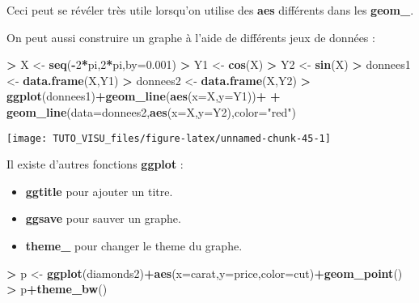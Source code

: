 \documentclass[]{article}
\newenvironment{Shaded}{\begin{snugshade}}{\end{snugshade}}
\newcommand{\DataTypeTok}[1]{\textcolor[rgb]{0.13,0.29,0.53}{#1}}
\newcommand{\DecValTok}[1]{\textcolor[rgb]{0.00,0.00,0.81}{#1}}
\newcommand{\FloatTok}[1]{\textcolor[rgb]{0.00,0.00,0.81}{#1}}
\newcommand{\KeywordTok}[1]{\textcolor[rgb]{0.13,0.29,0.53}{\textbf{#1}}}
\newcommand{\NormalTok}[1]{#1}
\newcommand{\OperatorTok}[1]{\textcolor[rgb]{0.81,0.36,0.00}{\textbf{#1}}}
\newcommand{\StringTok}[1]{\textcolor[rgb]{0.31,0.60,0.02}{#1}}
\providecommand{\tightlist}{%
  \setlength{\itemsep}{0pt}\setlength{\parskip}{0pt}}
\theoremstyle{definition}
\theoremstyle{definition}
\theoremstyle{definition}
\theoremstyle{remark}
\begin{document}
Ceci peut se révéler très utile lorsqu'on utilise des \textbf{aes} différents dans les \textbf{geom\_}.

On peut aussi construire un graphe à l'aide de différents jeux de données :

\begin{Shaded}
\begin{Highlighting}[]
\OperatorTok{>}\StringTok{ }\NormalTok{X <-}\StringTok{ }\KeywordTok{seq}\NormalTok{(}\OperatorTok{-}\DecValTok{2}\OperatorTok{*}\NormalTok{pi,}\DecValTok{2}\OperatorTok{*}\NormalTok{pi,}\DataTypeTok{by=}\FloatTok{0.001}\NormalTok{)}
\OperatorTok{>}\StringTok{ }\NormalTok{Y1 <-}\StringTok{ }\KeywordTok{cos}\NormalTok{(X)}
\OperatorTok{>}\StringTok{ }\NormalTok{Y2 <-}\StringTok{ }\KeywordTok{sin}\NormalTok{(X)}
\OperatorTok{>}\StringTok{ }\NormalTok{donnees1 <-}\StringTok{ }\KeywordTok{data.frame}\NormalTok{(X,Y1)}
\OperatorTok{>}\StringTok{ }\NormalTok{donnees2 <-}\StringTok{ }\KeywordTok{data.frame}\NormalTok{(X,Y2)}
\OperatorTok{>}\StringTok{ }\KeywordTok{ggplot}\NormalTok{(donnees1)}\OperatorTok{+}\KeywordTok{geom_line}\NormalTok{(}\KeywordTok{aes}\NormalTok{(}\DataTypeTok{x=}\NormalTok{X,}\DataTypeTok{y=}\NormalTok{Y1))}\OperatorTok{+}
\OperatorTok{+}\StringTok{   }\KeywordTok{geom_line}\NormalTok{(}\DataTypeTok{data=}\NormalTok{donnees2,}\KeywordTok{aes}\NormalTok{(}\DataTypeTok{x=}\NormalTok{X,}\DataTypeTok{y=}\NormalTok{Y2),}\DataTypeTok{color=}\StringTok{"red"}\NormalTok{)}
\end{Highlighting}
\end{Shaded}

\begin{center}\texttt{[image: TUTO\_VISU\_files/figure-latex/unnamed-chunk-45-1]} \end{center}

Il existe d'autres fonctions \textbf{ggplot} :

\begin{itemize}
\tightlist
\item
  \textbf{ggtitle} pour ajouter un titre.
\item
  \textbf{ggsave} pour sauver un graphe.
\item
  \textbf{theme\_} pour changer le theme du graphe.
\end{itemize}

\begin{Shaded}
\begin{Highlighting}[]
\OperatorTok{>}\StringTok{ }\NormalTok{p <-}\StringTok{ }\KeywordTok{ggplot}\NormalTok{(diamonds2)}\OperatorTok{+}\KeywordTok{aes}\NormalTok{(}\DataTypeTok{x=}\NormalTok{carat,}\DataTypeTok{y=}\NormalTok{price,}\DataTypeTok{color=}\NormalTok{cut)}\OperatorTok{+}\KeywordTok{geom_point}\NormalTok{()}
\OperatorTok{>}\StringTok{ }\NormalTok{p}\OperatorTok{+}\KeywordTok{theme_bw}\NormalTok{()}
\end{Highlighting}
\end{Shaded}
\end{document}
